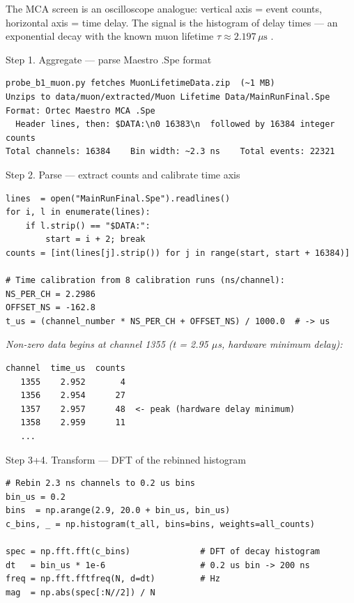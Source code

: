 \documentclass[11pt,a4paper,openany]{book}
\begin{document}
The MCA screen is an oscilloscope analogue: vertical axis = event
counts, horizontal axis = time delay. The signal is the histogram of
delay times --- an exponential decay with the known muon lifetime
$\tau \approx 2.197\,\mu\mathrm{s}$ \cite{PDG2022}.

\begin{pipelinestep}{Step 1. Aggregate --- parse Maestro .Spe format}
\begin{lstlisting}[style=shaddata]
probe_b1_muon.py fetches MuonLifetimeData.zip  (~1 MB)
Unzips to data/muon/extracted/Muon Lifetime Data/MainRunFinal.Spe
Format: Ortec Maestro MCA .Spe
  Header lines, then: $DATA:\n0 16383\n  followed by 16384 integer counts
Total channels: 16384    Bin width: ~2.3 ns    Total events: 22321
\end{lstlisting}
\end{pipelinestep}

\begin{pipelinestep}{Step 2. Parse --- extract counts and calibrate time axis}
\begin{lstlisting}[style=shadpython]
lines  = open("MainRunFinal.Spe").readlines()
for i, l in enumerate(lines):
    if l.strip() == "$DATA:":
        start = i + 2; break
counts = [int(lines[j].strip()) for j in range(start, start + 16384)]

# Time calibration from 8 calibration runs (ns/channel):
NS_PER_CH = 2.2986
OFFSET_NS = -162.8
t_us = (channel_number * NS_PER_CH + OFFSET_NS) / 1000.0  # -> us
\end{lstlisting}
\textit{Non-zero data begins at channel 1355 (t = 2.95 $\mu$s, hardware minimum delay):}
\begin{lstlisting}[style=shaddata]
channel  time_us  counts
   1355    2.952       4
   1356    2.954      27
   1357    2.957      48  <- peak (hardware delay minimum)
   1358    2.959      11
   ...
\end{lstlisting}
\end{pipelinestep}

\begin{pipelinestep}{Step 3+4. Transform --- DFT of the rebinned histogram}
\begin{lstlisting}[style=shadpython]
# Rebin 2.3 ns channels to 0.2 us bins
bin_us = 0.2
bins  = np.arange(2.9, 20.0 + bin_us, bin_us)
c_bins, _ = np.histogram(t_all, bins=bins, weights=all_counts)

spec = np.fft.fft(c_bins)              # DFT of decay histogram
dt   = bin_us * 1e-6                   # 0.2 us bin -> 200 ns
freq = np.fft.fftfreq(N, d=dt)         # Hz
mag  = np.abs(spec[:N//2]) / N
\end{lstlisting}
\end{pipelinestep}
\end{document}
